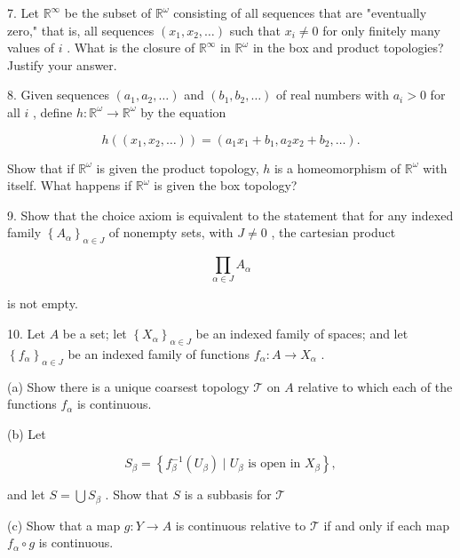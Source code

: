 \documentclass[10pt]{article}
\begin{document}
7. Let \({\mathbb{R}}^{\infty }\) be the subset of \({\mathbb{R}}^{\omega }\) consisting of all sequences that are "eventually zero," that is, all sequences \(\left( {{x}_{1},{x}_{2},\ldots }\right)\) such that \({x}_{i} \neq  0\) for only finitely many values of \(i\) . What is the closure of \({\mathbb{R}}^{\infty }\) in \({\mathbb{R}}^{\omega }\) in the box and product topologies? Justify your answer.

8. Given sequences \(\left( {{a}_{1},{a}_{2},\ldots }\right)\) and \(\left( {{b}_{1},{b}_{2},\ldots }\right)\) of real numbers with \({a}_{i} > 0\) for all \(i\) , define \(h : {\mathbb{R}}^{\omega } \rightarrow  {\mathbb{R}}^{\omega }\) by the equation

\[
h\left( \left( {{x}_{1},{x}_{2},\ldots }\right) \right)  = \left( {{a}_{1}{x}_{1} + {b}_{1},{a}_{2}{x}_{2} + {b}_{2},\ldots }\right) .
\]

Show that if \({\mathbb{R}}^{\omega }\) is given the product topology, \(h\) is a homeomorphism of \({\mathbb{R}}^{\omega }\) with itself. What happens if \({\mathbb{R}}^{\omega }\) is given the box topology?

9. Show that the choice axiom is equivalent to the statement that for any indexed family \({\left\{  {A}_{\alpha }\right\}  }_{\alpha  \in  J}\) of nonempty sets, with \(J \neq  0\) , the cartesian product

\[
\mathop{\prod }\limits_{{\alpha  \in  J}}{A}_{\alpha }
\]

is not empty.

10. Let \(A\) be a set; let \({\left\{  {X}_{\alpha }\right\}  }_{\alpha  \in  J}\) be an indexed family of spaces; and let \({\left\{  {f}_{\alpha }\right\}  }_{\alpha  \in  J}\) be an indexed family of functions \({f}_{\alpha } : A \rightarrow  {X}_{\alpha }\) .

(a) Show there is a unique coarsest topology \(\mathcal{T}\) on \(A\) relative to which each of the functions \({f}_{\alpha }\) is continuous.

(b) Let

\[
{S}_{\beta } = \left\{  {{f}_{\beta }^{-1}\left( {U}_{\beta }\right)  \mid  {U}_{\beta }\text{ is open in }{X}_{\beta }}\right\}  ,
\]

and let \(S = \bigcup {S}_{\beta }\) . Show that \(S\) is a subbasis for \(\mathcal{T}\)

(c) Show that a map \(g : Y \rightarrow  A\) is continuous relative to \(\mathcal{T}\) if and only if each map \({f}_{\alpha } \circ  g\) is continuous.
\end{document}
